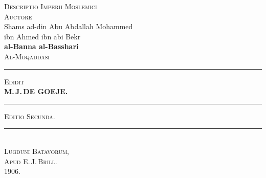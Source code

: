 \documentclass[11pt,a4paper]{article}
\newcommand{\shortline}{\noindent\rule{0.5\textwidth}{0.4pt}\par}
\begin{document}
\clearpage






\thispagestyle{empty}

\begin{center}

\vspace*{2cm}



{\Huge\textsc{Descriptio Imperii Moslemici}}\\[2cm]



{\large\textsc{Auctore}}\\[1cm]



{\Large Shams ad-din Abu Abdallah Mohammed}\\

{\Large ibn Ahmed ibn abi Bekr}\\[0.3cm]

{\Large\textbf{al-Banna al-Basshari}}\\[1cm]



{\LARGE\textsc{Al-Moqaddasi}}\\[2cm]



\shortline

\vspace{0.5cm}



{\large\textsc{Edidit}}\\[0.5cm]



{\LARGE\textbf{M.\,J.\,DE GOEJE.}}\\[1.5cm]



\shortline

\vspace{1cm}



{\large\textsc{Editio Secunda.}}\\[2cm]



\vfill



\rule{0.3\textwidth}{0.6pt}\\[0.5cm]



{\large\textsc{Lugduni Batavorum,}}\\

{\large\textsc{Apud E.\,J.\,Brill.}}\\

{\large\textsc{1906.}}\\



\end{center}
\end{document}
